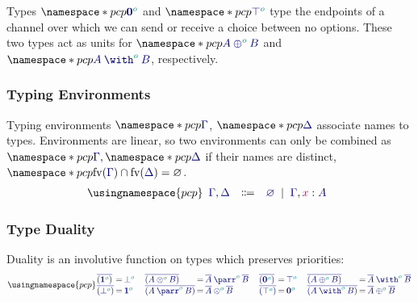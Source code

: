 Types $\pcp{\ty{\tynil[\cs{o}]}}$ and $\pcp{\ty{\tytop[\cs{o}]}}$ type the endpoints of a channel over which we can send or receive a choice between {no options}. These two types act as units for $\pcp{\ty{\typlus[\cs{o}]{A}{B}}}$ and $\pcp{\ty{\tywith[\cs{o}]{A}{B}}}$, respectively.

\subsubsection*{Typing Environments}
\label{sec:pcp-environments}
Typing environments $\pcp{\ty{\Gamma}}$, $\pcp{\ty{\Delta}}$ associate names to types. Environments are linear, so two environments can only be combined as $\pcp{\ty{\Gamma}}, \pcp{\ty{\Delta}}$ if their names are distinct, \ie $\pcp{\fv(\ty{\Gamma})\cap\fv(\ty{\Delta})=\varnothing}$.
\[
  \usingnamespace{pcp}
  \begin{array}{lcl}
    \ty{\Gamma}, \ty{\Delta}
    & \Coloneqq & \ty{\emptyenv}
      \sep        \ty{\Gamma}, \tmty{x}{A}
  \end{array}
\]

\subsubsection*{Type Duality}
\label{sec:pcp-duality}
Duality is an involutive function on types which preserves priorities:
\[
  \usingnamespace{pcp}
  \setlength{\arraycolsep}{1pt}
  \begin{array}{lcl}
    \ty{\co{(\tyone[\cs{o}])}} & = & \ty{\tybot[\cs{o}]} \\
    \ty{\co{(\tybot[\cs{o}])}} & = & \ty{\tyone[\cs{o}]}
  \end{array}
  \quad
  \begin{array}{lcl}
    \ty{\co{(\tytens[\cs{o}]{A}{B})}} & = & \ty{\typarr[\cs{o}]{\co{A}}{\co{B}}} \\
    \ty{\co{(\typarr[\cs{o}]{A}{B})}} & = & \ty{\tytens[\cs{o}]{\co{A}}{\co{B}}}
  \end{array}
  \quad
  \begin{array}{lcl}
    \ty{\co{(\tynil[\cs{o}])}} & = & \ty{\tytop[\cs{o}]} \\
    \ty{\co{(\tytop[\cs{o}])}} & = & \ty{\tynil[\cs{o}]}
  \end{array}
  \quad
  \begin{array}{lcl}
    \ty{\co{(\typlus[\cs{o}]{A}{B})}} & = & \ty{\tywith[\cs{o}]{\co{A}}{\co{B}}} \\
    \ty{\co{(\tywith[\cs{o}]{A}{B})}} & = & \ty{\typlus[\cs{o}]{\co{A}}{\co{B}}}
  \end{array}
\]

